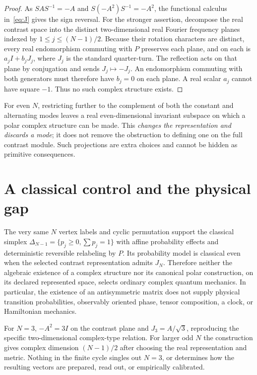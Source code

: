 \documentclass[11pt,letterpaper]{article}
\begin{document}
\begin{proof}
As $SAS^{-1}=-A$ and $S(-A^2)S^{-1}=-A^2$, the functional calculus in~\eqref{eq:J} gives the sign reversal. For the stronger assertion, decompose the real contrast space into the distinct two-dimensional real Fourier frequency planes indexed by $1\le j\le(N-1)/2$. Because their rotation characters are distinct, every real endomorphism commuting with $P$ preserves each plane, and on each is $a_j I+b_jJ_j$, where $J_j$ is the standard quarter-turn. The reflection acts on that plane by conjugation and sends $J_j\mapsto-J_j$. An endomorphism commuting with both generators must therefore have $b_j=0$ on each plane. A real scalar $a_j$ cannot have square $-1$. Thus no such complex structure exists.
\end{proof}
\begin{remark}
For even $N$, restricting further to the complement of both the constant and alternating modes leaves a real even-dimensional invariant subspace on which a polar complex structure can be made. This \emph{changes the representation and discards a mode}; it does not remove the obstruction to defining one on the full contrast module. Such projections are extra choices and cannot be hidden as primitive consequences.
\end{remark}
\section{A classical control and the physical gap}
The very same $N$ vertex labels and cyclic permutation support the classical simplex $\Delta_{N-1}=\{p_j\ge0,\sum p_j=1\}$ with affine probability effects and deterministic reversible relabeling by $P$. Its probability model is classical even when the selected contrast representation admits $J_N$. Therefore neither the algebraic existence of a complex structure nor its canonical polar construction, on its declared represented space, selects ordinary complex quantum mechanics. In particular, the existence of an antisymmetric matrix does not supply physical transition probabilities, observably oriented phase, tensor composition, a clock, or Hamiltonian mechanics.

For $N=3$, $-A^2=3I$ on the contrast plane and $J_3=A/\sqrt3$, reproducing the specific two-dimensional complex-type relation. For larger odd $N$ the construction gives complex dimension $(N-1)/2$ after choosing the real representation and metric. Nothing in the finite cycle singles out $N=3$, or determines how the resulting vectors are prepared, read out, or empirically calibrated.
\end{document}
